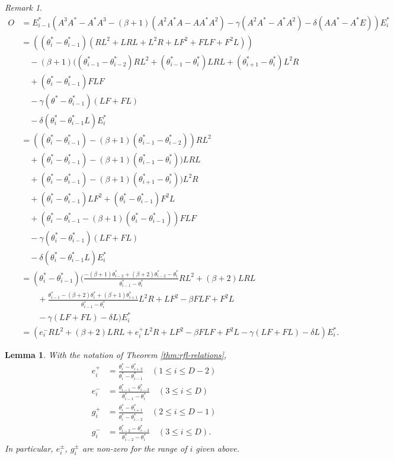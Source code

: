 \documentclass[
]{book}
\newtheorem{lemma}{Lemma}[chapter]
\theoremstyle{definition}
\theoremstyle{definition}
\theoremstyle{definition}
\theoremstyle{definition}
\theoremstyle{remark}
\newtheorem*{remark}{Remark}
\begin{document}
\begin{remark}
\begin{align}
O & = E^*_{i-1}(A^3A^*-A^*A^3-(\beta+1)(A^2A^*A-AA^*A^2)-\gamma(A^2A^*-A^*A^2)-\delta(AA^*-A^*E))E^*_i\\
& = ((\theta^*_i-\theta^*_{i-1})(RL^2+ LRL + L^2R + LF^2 + FLF + F^2L))\\
& \quad -(\beta+1)((\theta^*_{i-1}-\theta^*_{i-2})RL^2 + (\theta^*_{i-1}-\theta^*_i)LRL + (\theta^*_{i+1}-\theta^*_i)L^2R\\
& \quad + (\theta^*_i-\theta^*_{i-1})FLF\\
& \quad - \gamma(\theta^*-\theta^*_{i-1})(LF+FL)\\
& \quad - \delta(\theta^*_i-\theta^*_{i-1}L)E^*_i\\
& = ((\theta^*_i-\theta^*_{i-1})-(\beta+1)(\theta^*_{i-1}-\theta^*_{i-2}))RL^2 \\
& \quad + (\theta^*_i-\theta^*_{i-1})-(\beta+1)(\theta^*_{i-1}-\theta^*_{i}))LRL\\
& \quad + (\theta^*_i-\theta^*_{i-1})-(\beta+1)(\theta^*_{i+1}-\theta^*_{i}))L^2R\\
& \quad + (\theta^*_{i}-\theta^*_{i-1})LF^2 + (\theta^*_i-\theta^*_{i-1})F^2L\\
& \quad + (\theta^*_i - \theta^*_{i-1}-(\beta+1)(\theta^*_i-\theta^*_{i-1}))FLF\\
& \quad - \gamma(\theta^*_i-\theta^*_{i-1})(LF+FL)\\
& \quad - \delta (\theta^*_i-\theta^*_{i-1}L)E^*_i\\
& = (\theta^*_i-\theta^*_{i-1})\biggl(\frac{-(\beta+1)\theta^*_{i-2}+(\beta+2)\theta^*_{i-2}-\theta^*_i}{\theta^*_{i-1}-\theta^*_i}RL^2+(\beta+2)LRL\\
& \qquad + \frac{\theta^*_{i-1}-(\beta+2)\theta^*_i+(\beta+1)\theta^*_{i+1}}{\theta^*_{i-1}-\theta^*_i}L^2R + LF^2 - \beta FLF + F^2L\\
& \qquad -\gamma(LF+FL) - \delta L\biggr)E^*_i\\
& = (e^-_iRL^2 + (\beta+2)LRL + e^+_iL^2R + LF^2 - \beta FLF + F^2L-\gamma(LF+FL)-\delta L)E^*_i.
\end{align}

\end{remark}

\begin{lemma}
\protect\hypertarget{lem:epm-gpm}{}\label{lem:epm-gpm}With the notation of Theorem \ref{thm:rfl-relations},
\begin{align}
e^+_i & = \frac{\theta^*_i-\theta^*_{i+2}}{\theta^*_i-\theta^*_{i-1}} \quad (1\leq i\leq D-2)\\
e^-_i & = \frac{\theta^*_{i-1}-\theta^*_{i-3}}{\theta^*_{i-1}-\theta^*_{i}} \quad (3\leq i\leq D)\\
g^+_i & = \frac{\theta^*_i-\theta^*_{i+1}}{\theta^*_i-\theta^*_{i-2}} \quad (2\leq i\leq D-1)\\
g^-_i & = \frac{\theta^*_{i-2}-\theta^*_{i-3}}{\theta^*_{i-2}-\theta^*_{i}} \quad (3\leq i\leq D).
\end{align}
In particular, \(e^\pm_i\), \(g^\pm_i\) are non-zero for the range of \(i\) given above.
\end{lemma}
\end{document}
